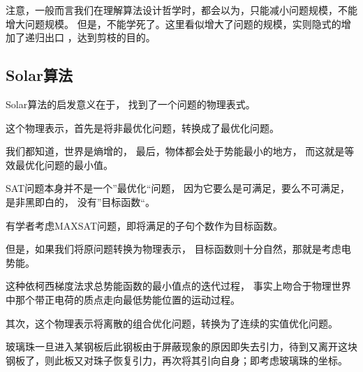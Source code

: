 \documentclass[12pt]{ctexart}
\begin{document}
注意，一般而言我们在理解算法设计哲学时，都会以为，只能减小问题规模，不能增大问题规模。
但是，不能学死了。这里看似增大了问题的规模，实则隐式的增加了递归出口
，达到剪枝的目的。

\subsection{Solar算法}

Solar算法的启发意义在于， 找到了一个问题的物理表式。

这个物理表示，首先是将非最优化问题，转换成了最优化问题。

我们都知道，世界是熵增的，
最后，物体都会处于势能最小的地方，
而这就是等效最优化问题的最小值。

SAT问题本身并不是一个”最优化“问题，
因为它要么是可满足，要么不可满足，
是非黑即白的， 没有”目标函数“。

有学者考虑MAXSAT问题，即将满足的子句个数作为目标函数。

但是，如果我们将原问题转换为物理表示，
目标函数则十分自然，那就是考虑电势能。

这种依柯西梯度法求总势能函数的最小值点的迭代过程，
事实上吻合于物理世界中那个带正电荷的质点走向最低势能位置的运动过程。

其次，这个物理表示将离散的组合优化问题，转换为了连续的实值优化问题。

玻璃珠一旦进入某钢板后此钢板由于屏蔽现象的原因即失去引力，待到又离开这块钢板了，则此板又对珠子恢复引力，再次将其引向自身；即考虑玻璃珠的坐标。
\end{document}

